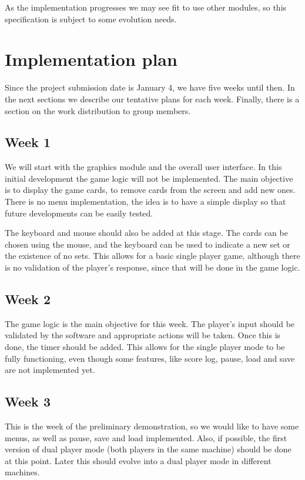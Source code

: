 \documentclass[11pt,a4paper,reqno]{report}
\numberwithin{equation}{section}
\begin{document}
As the implementation progresses we may see fit to use other modules, so this specification is subject to some evolution needs.

\chapter{Implementation plan}

Since the project submission date is January 4, we have five weeks until then. In the next sections we describe our tentative plans for each week. Finally, there is a section on the work distribution to group members.

\section{Week 1}

We will start with the graphics module and the overall user interface. In this initial development the game logic will not be implemented. The main objective is to display the game cards, to remove cards from the screen and add new ones. There is no menu implementation, the idea is to have a simple display so that future developments can be easily tested.

The keyboard and mouse should also be added at this stage. The cards can be chosen using the mouse, and the keyboard can be used to indicate a new set or the existence of no sets. This allows for a basic single player game, although there is no validation of the player's response, since that will be done in the game logic.

\section{Week 2}

The game logic is the main objective for this week. The player's input should be validated by the software and appropriate actions will be taken. Once this is done, the timer should be added. This allows for the single player mode to be fully functioning, even though some features, like score log, pause, load and save are not implemented yet.

\section{Week 3}

This is the week of the preliminary demonstration, so we would like to have some menus, as well as pause, save and load implemented. Also, if possible, the first version of dual player mode (both players in the same machine) should be done at this point. Later this should evolve into a dual player mode in different machines. 
\end{document}
